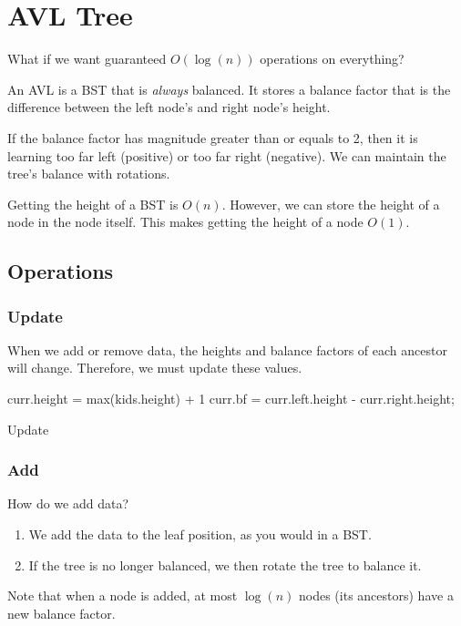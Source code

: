 \section{AVL Tree}

What if we want guaranteed \( O(\log(n)) \) operations on everything?
\begin{definition}
	An AVL is a BST that is \textit{always} balanced. It stores a balance factor that is the difference between the left node's and right node's height.
\end{definition}

If the balance factor has magnitude greater than or equals to 2, then it is learning too far left (positive) or too far right (negative). We can maintain the tree's balance with rotations.

\begin{note}
	Getting the height of a BST is \( O(n) \). However, we can store the height of a node in the node itself. This makes getting the height of a node \( O(1) \).
\end{note}

\subsection{Operations}
\subsubsection{Update}
When we add or remove data, the heights and balance factors of each ancestor will change. Therefore, we must update these values.

\begin{algorithm}[H]
	curr.height = max(kids.height) + 1\;
	curr.bf = curr.left.height - curr.right.height; 
	\caption{Update} 
\end{algorithm}
\subsubsection{Add}
How do we add data?
\begin{enumerate}
	\item We add the data to the leaf position, as you would in a BST.
	\item If the tree is no longer balanced, we then rotate the tree to balance it.
\end{enumerate}
Note that when a node is added, at most \( \log (n) \) nodes (its ancestors) have a new balance factor.


